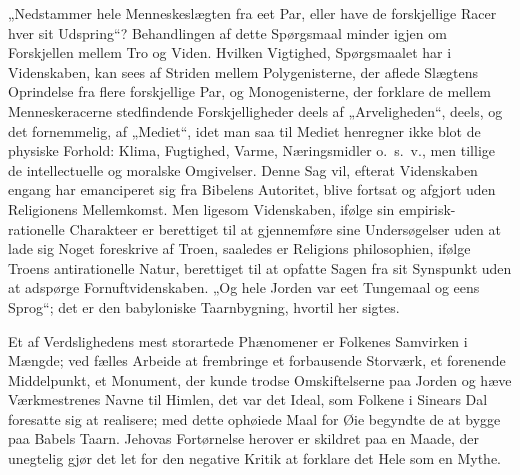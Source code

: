 \documentclass[12pt]{book}
\begin{document}
„Nedstammer hele Menneskeslægten fra eet Par, eller have de
forskjellige Racer hver sit Udspring“? Behandlingen af dette
Spørgsmaal minder igjen om Forskjellen mellem Tro og Viden. Hvilken
Vigtighed, Spørgsmaalet har i Videnskaben, kan sees af Striden
mellem Polygenisterne, der aflede Slægtens Oprindelse fra flere
forskjellige Par, og Monogenisterne, der forklare de mellem
Menneskeracerne stedfindende Forskjelligheder deels af
„Arveligheden“, deels, og det fornemmelig, af „Mediet“, idet man saa
til Mediet henregner ikke blot de physiske Forhold: Klima, Fugtighed,
Varme, Næringsmidler o.\ s.\ v., men tillige de intellectuelle og
moralske Omgivelser. Denne Sag vil, efterat Videnskaben engang har
emanciperet sig fra Bibelens Autoritet, blive fortsat og afgjort
uden Religionens Mellemkomst. Men ligesom Videnskaben, ifølge sin
empirisk-rationelle Charakteer er berettiget til at gjennemføre sine
Undersøgelser uden at lade sig Noget foreskrive af Troen, saaledes
er Religions\-
philosophien, ifølge Troens antirationelle Natur, berettiget til at
opfatte Sagen fra sit Synspunkt uden at adspørge Fornuftvidenskaben.
„Og hele Jorden var eet Tungemaal og eens Sprog“; det er den
babyloniske Taarnbygning, hvortil her sigtes.

Et af Verdslighedens mest storartede Phænomener er Folkenes
Samvirken i Mængde; ved fælles Arbeide at frembringe et forbausende
Storværk, et forenende Middelpunkt, et Monument, der kunde trodse
Omskiftelserne paa Jorden og hæve Værkmestrenes Navne til Himlen,
det var det Ideal, som Folkene i Sinears Dal foresatte sig at
realisere; med dette ophøiede Maal for Øie begyndte de at bygge paa
Babels Taarn. Jehovas Fortørnelse herover er skildret paa en Maade,
der unegtelig gjør det let for den negative Kritik at forklare det
Hele som en Mythe.
\end{document}
